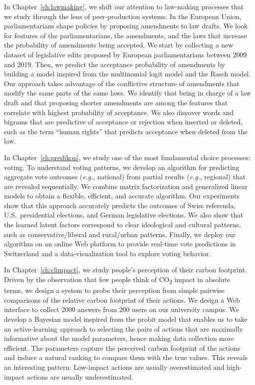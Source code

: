 In Chapter~\ref{ch:lawmaking}, we shift our attention to law-making processes that we study through the lens of peer-production systems.
In the European Union, parliamentarians shape policies by proposing amendments to law drafts.
We look for features of the parliamentarians, the amendments, and the laws that increase the probability of amendments being accepted.
We start by collecting a new dataset of  legislative edits proposed by European parliamentarians between 2009 and 2019.
Then, we predict the acceptance probability of amendments by building a model inspired from the multinomial logit model and the Rasch model.
Our approach takes advantage of the conflictive structure of amendments that modify the same parts of the same laws.
We identify that being in charge of a law draft and that proposing shorter amendments are among the features that correlate with highest probability of acceptance.
We also discover words and bigrams that are predictive of acceptance or rejection when inserted or deleted, such as the term ``human rights'' that predicts acceptance when deleted from the law.

In Chapter~\ref{ch:predikon}, we study one of the most fundamental choice processes: voting.
To understand voting patterns, we develop an algorithm for predicting aggregate vote outcomes (\textit{e.g.}, national) from partial results (\textit{e.g.}, regional) that are revealed sequentially.
We combine matrix factorization and generalized linear models to obtain a flexible, efficient, and accurate algorithm.
Our experiments show that this approach accurately predicts the outcomes of Swiss referenda, U.S.\ presidential elections, and German legislative elections.
We also show that the learned latent factors correspond to clear ideological and cultural patterns, such as conservative/liberal and rural/urban patterns.
Finally, we deploy our algorithm on an online Web platform to provide real-time vote predictions in Switzerland and a data-visualization tool to explore voting behavior.

In Chapter~\ref{ch:climpact}, we study people's perception of their carbon footprint.
Driven by the observation that few people think of CO\textsubscript{2} impact in absolute terms, we design a system to probe their perception from simple pairwise comparisons of the relative carbon footprint of their actions.
We design a Web interface to collect 2000 answers from 200 users on our university campus.
We develop a Bayesian model inspired from the probit model that enables us to take an active-learning approach to selecting the pairs of actions that are maximally informative about the model parameters, hence making data collection more efficient.
The parameters capture the perceived carbon footprint of the actions and induce a natural ranking to compare them with the true values.
This reveals an interesting pattern:
Low-impact actions are usually overestimated and high-impact actions are usually underestimated.

